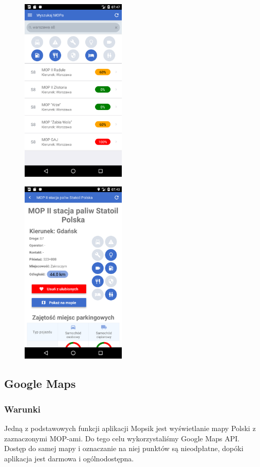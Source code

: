 \begin{figure}[!htb]
\centering
\begin{minipage}{.5\textwidth}
  \centering
  \includegraphics[width=5cm]{images/mopsik_mobile/search.png}
  \label{mopsik_search}
\end{minipage}%
\begin{minipage}{.5\textwidth}
  \centering
  \includegraphics[width=5cm]{images/mopsik_mobile/details.png}
  \label{mopsik_details}
\end{minipage}
\end{figure}


\subsection{Google Maps}
\subsubsection{Warunki}
Jedną z podstawowych funkcji aplikacji Mopsik jest wyświetlanie mapy Polski z zaznaczonymi MOP-ami. Do tego celu wykorzystaliśmy Google Maps API. Dostęp do samej mapy i oznaczanie na niej punktów są nieodpłatne, dopóki aplikacja jest darmowa i ogólnodostępna\cite{google-api-faq}.
